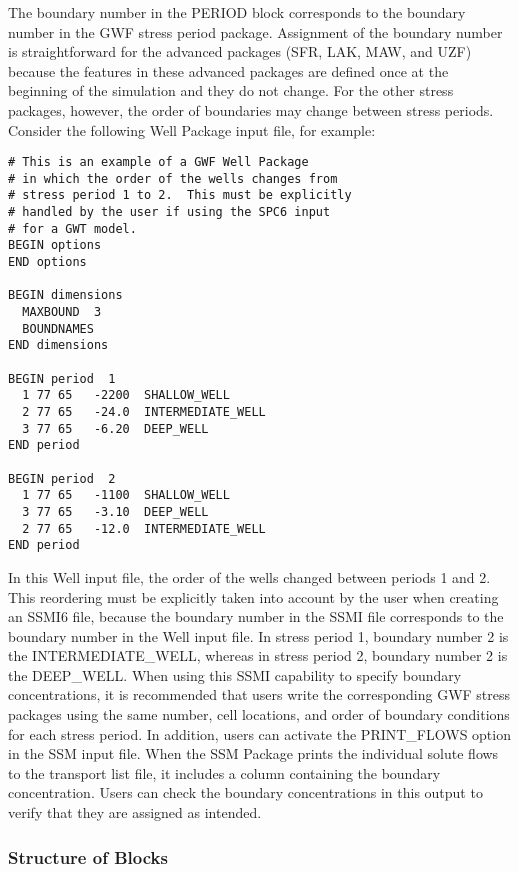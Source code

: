 The boundary number in the PERIOD block corresponds to the boundary number in the GWF stress period package.  Assignment of the boundary number is straightforward for the advanced packages (SFR, LAK, MAW, and UZF) because the features in these advanced packages are defined once at the beginning of the simulation and they do not change.  For the other stress packages, however, the order of boundaries may change between stress periods.  Consider the following Well Package input file, for example:

\begin{verbatim}
# This is an example of a GWF Well Package
# in which the order of the wells changes from
# stress period 1 to 2.  This must be explicitly
# handled by the user if using the SPC6 input
# for a GWT model.
BEGIN options
END options

BEGIN dimensions
  MAXBOUND  3
  BOUNDNAMES
END dimensions

BEGIN period  1
  1 77 65   -2200  SHALLOW_WELL
  2 77 65   -24.0  INTERMEDIATE_WELL
  3 77 65   -6.20  DEEP_WELL
END period

BEGIN period  2
  1 77 65   -1100  SHALLOW_WELL
  3 77 65   -3.10  DEEP_WELL
  2 77 65   -12.0  INTERMEDIATE_WELL
END period
\end{verbatim}

\noindent In this Well input file, the order of the wells changed between periods 1 and 2.  This reordering must be explicitly taken into account by the user when creating an SSMI6 file, because the boundary number in the SSMI file corresponds to the boundary number in the Well input file.  In stress period 1, boundary number 2 is the INTERMEDIATE\_WELL, whereas in stress period 2, boundary number 2 is the DEEP\_WELL.  When using this SSMI capability to specify boundary concentrations, it is recommended that users write the corresponding GWF stress packages using the same number, cell locations, and order of boundary conditions for each stress period.   In addition, users can activate the PRINT\_FLOWS option in the SSM input file.  When the SSM Package prints the individual solute flows to the transport list file, it includes a column containing the boundary concentration.  Users can check the boundary concentrations in this output to verify that they are assigned as intended.

\vspace{5mm}
\subsubsection{Structure of Blocks}
\vspace{5mm}

